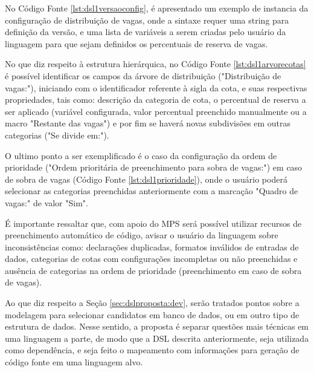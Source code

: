    No Código Fonte \ref{lst:dsl1versaoconfig}, é apresentado um exemplo de instancia da configuração de distribuição de vagas, onde a sintaxe requer uma string para definição da versão, e uma lista de variáveis a serem criadas pelo usuário da linguagem para que sejam definidos os percentuais de reserva de vagas.
   
   


No que diz respeito à estrutura hierárquica, no Código Fonte \ref{lst:dsl1arvorecotas} é possível identificar os campos da árvore de distribuição ("Distribuição de vagas:"), iniciando com o identificador referente à sigla da cota, e suas respectivas propriedades, tais como: descrição da categoria de cota, o percentual de reserva a ser aplicado (variável configurada, valor percentual preenchido manualmente ou a macro "Restante das vagas") e por fim se haverá novas subdivisões em outras categorias ("Se divide em:").

   


O ultimo ponto a ser exemplificado é o caso da configuração da ordem de prioridade ("Ordem prioritária de preenchimento para sobra de vagas:") em caso de sobra de vagas (Código Fonte \ref{lst:dsl1prioridade}), onde o usuário poderá selecionar as categorias preenchidas anteriormente com a marcação "Quadro de vagas:" de valor "Sim".  

   

É importante ressaltar que, com apoio do \gls{MPS} será possível utilizar recursos de preenchimento automático de código, avisar o usuário da linguagem sobre inconsistências como: declarações duplicadas, formatos inválidos de entradas de dados, categorias de cotas com configurações incompletas ou não preenchidas e ausência de categorias na ordem de prioridade (preenchimento em caso de sobra de vagas). 

Ao que diz respeito a Seção \ref{sec:dslproposta:dev}, serão tratados pontos sobre a modelagem para selecionar candidatos em banco de dados, ou em outro tipo de estrutura de dados. Nesse sentido, a proposta é separar questões mais técnicas em uma linguagem a parte, de modo que a \gls{DSL} descrita anteriormente, seja utilizada como dependência, e seja feito o mapeamento com informações para geração de código fonte em uma linguagem alvo.